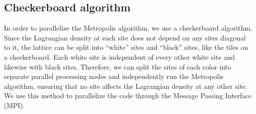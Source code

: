 \subsection{Checkerboard algorithm}

In order to parallelize the Metropolis algorithm, we use a checkerboard algorithm. Since the Lagrangian density at each site does not depend on any sites diagonal to it, the lattice can be split into ``white'' sites and ``black'' sites, like the tiles on a checkerboard. Each white site is independent of every other white site and likewise with black sites. Therefore, we can split the sites of each color into separate parallel processing nodes and independently run the Metropolis algorithm, ensuring that no site affects the Lagrangian density at any other site. We use this method to parallelize the code through the Message Passing Interface (MPI).

